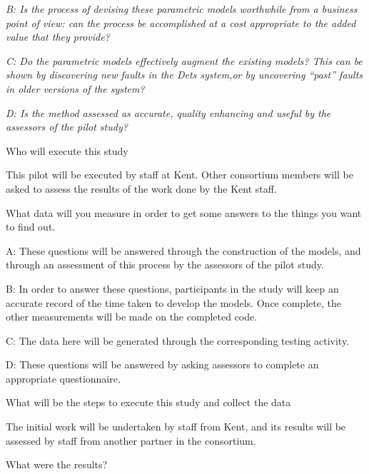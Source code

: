 \documentclass[a4paper,english]{article}
\newcounter{questenum}
\newcommand{\liststyleQuestion}{%
\renewcommand\theenumi{\roman{enumi}}
\renewcommand\theenumii{\alph{enumii}}
\renewcommand\theenumiii{\arabic{enumiii}}
\renewcommand\theenumiv{\arabic{enumiv}}
\renewcommand\labelenumi{\theenumi.}
\renewcommand\labelenumii{\theenumii.}
\renewcommand\labelenumiii{\theenumiii.}
\renewcommand\labelenumiv{\theenumiv.}
}
\newenvironment{questionenum}
{ \liststyleQuestion
  \enumerate
  \setcounter{enumi}{\value{questenum}}
  \bfseries
  \itshape }
{ \endenumerate
  \setcounter{questenum}{\value{enumi}} }
\begin{document}
\textit{B: Is the process of devising these parametric models worthwhile from a business point of view: can the process 
be accomplished at a cost appropriate to the added value that they provide?}

\textit{C: Do the parametric models effectively augment the existing models? This can be shown by discovering new 
faults in the Dets system,or by uncovering ``past'' faults in older versions of the system?}

\textit{D: Is the method assessed as accurate, quality enhancing and useful by the assessors of the pilot study?}

\begin{questionenum}
\item Who will execute this study
\end{questionenum}

This pilot will be executed by staff at Kent. Other consortium members will be asked to assess the results of the work 
done by the Kent staff.

\begin{questionenum}
\item What data will you measure in order to get some answers to the things you want to find out.
\end{questionenum}

A: These questions will be answered through the construction of the models, and through an assessment of this process 
by the assessors of the pilot study.

B: In order to answer these questions, participants in the study will keep an accurate record of the time taken to 
develop the models. Once complete, the other measurements will be made on the completed code.

C: The data here will be generated through the corresponding testing activity.

D: These questions will be answered by asking assessors to complete an appropriate questionnaire.

\begin{questionenum}
\item What will be the steps to execute this study and collect the data
\end{questionenum}

The initial work will be undertaken by staff from Kent, and its results will be assessed by staff from another partner 
in the consortium.

\begin{questionenum}
\item What were the results?
\end{questionenum}
\end{document}
